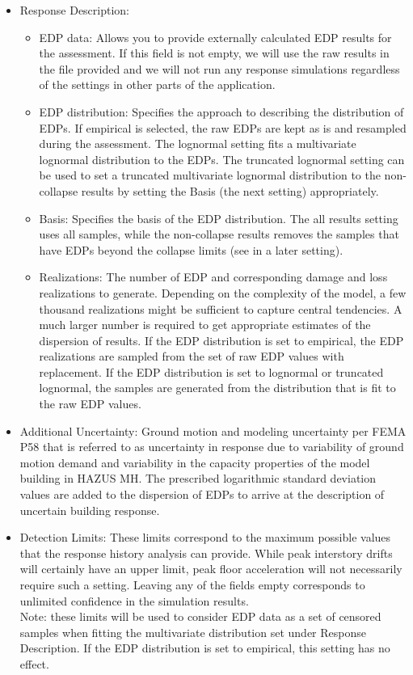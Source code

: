 \begin{itemize}
	\item Response Description:
	\begin{itemize}
		\item EDP data: Allows you to provide externally calculated EDP results for the assessment. If this field is not empty, we will use the raw results in the file provided and we will not run any response simulations regardless of the settings in other parts of the application. 
		\item EDP distribution: Specifies the approach to describing the distribution of EDPs. If empirical is selected, the raw EDPs are kept as is and resampled during the assessment. The lognormal setting fits a multivariate lognormal distribution to the EDPs. The truncated lognormal setting can be used to set a truncated multivariate lognormal distribution to the non-collapse results by setting the Basis (the next setting) appropriately.
		\item Basis: Specifies the basis of the EDP distribution. The all results setting uses all samples, while the non-collapse results removes the samples that have EDPs beyond the collapse limits (see in a later setting).
		\item Realizations: The number of EDP and corresponding damage and loss realizations to generate. Depending on the complexity of the model, a few thousand realizations might be sufficient to capture central tendencies. A much larger number is required to get appropriate estimates of the dispersion of results. If the EDP distribution is set to empirical, the EDP realizations are sampled from the set of raw EDP values with replacement. If the EDP distribution is set to lognormal or truncated lognormal, the samples are generated from the distribution that is fit to the raw EDP values.
	\end{itemize}
	\item Additional Uncertainty: Ground motion and modeling uncertainty per FEMA P58 that is referred to as uncertainty in response due to variability of ground motion demand and variability in the capacity properties of the model building in HAZUS MH. The prescribed logarithmic standard deviation values are added to the dispersion of EDPs to arrive at the description of uncertain building response.
	\item Detection Limits: These limits correspond to the maximum possible values that the response history analysis can provide. While peak interstory drifts will certainly have an upper limit, peak floor acceleration will not necessarily require such a setting. Leaving any of the fields empty corresponds to unlimited confidence in the simulation results.\\
	Note: these limits will be used to consider EDP data as a set of censored samples when fitting the multivariate distribution set under Response Description. If the EDP distribution is set to empirical, this setting has no effect.
\end{itemize}

